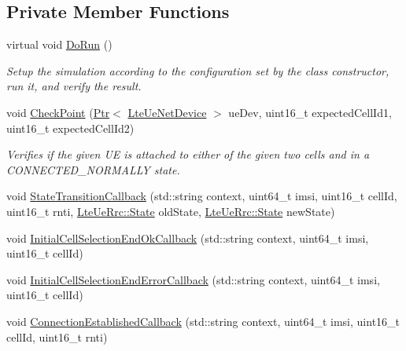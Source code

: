 \subsection*{Private Member Functions}
\begin{DoxyCompactItemize}
\item 
virtual void \hyperlink{classLteCellSelectionTestCase_a2ad9dadf26f7beb5d3ed1c6dfbcef90a}{Do\+Run} ()
\begin{DoxyCompactList}\small\item\em Setup the simulation according to the configuration set by the class constructor, run it, and verify the result. \end{DoxyCompactList}\item 
void \hyperlink{classLteCellSelectionTestCase_a12372e70c3609e0c3606a67494bc819e}{Check\+Point} (\hyperlink{classns3_1_1Ptr}{Ptr}$<$ \hyperlink{classns3_1_1LteUeNetDevice}{Lte\+Ue\+Net\+Device} $>$ ue\+Dev, uint16\+\_\+t expected\+Cell\+Id1, uint16\+\_\+t expected\+Cell\+Id2)
\begin{DoxyCompactList}\small\item\em Verifies if the given UE is attached to either of the given two cells and in a C\+O\+N\+N\+E\+C\+T\+E\+D\+\_\+\+N\+O\+R\+M\+A\+L\+LY state. \end{DoxyCompactList}\item 
void \hyperlink{classLteCellSelectionTestCase_af32c056747497954d3757c33ee9ecf0a}{State\+Transition\+Callback} (std\+::string context, uint64\+\_\+t imsi, uint16\+\_\+t cell\+Id, uint16\+\_\+t rnti, \hyperlink{classns3_1_1LteUeRrc_a241012c291e75681150c9214e11f6145}{Lte\+Ue\+Rrc\+::\+State} old\+State, \hyperlink{classns3_1_1LteUeRrc_a241012c291e75681150c9214e11f6145}{Lte\+Ue\+Rrc\+::\+State} new\+State)
\item 
void \hyperlink{classLteCellSelectionTestCase_a1356f0354e8a62c7078a325bc71c9f32}{Initial\+Cell\+Selection\+End\+Ok\+Callback} (std\+::string context, uint64\+\_\+t imsi, uint16\+\_\+t cell\+Id)
\item 
void \hyperlink{classLteCellSelectionTestCase_adb7a5645850282a9a8782206c28f1799}{Initial\+Cell\+Selection\+End\+Error\+Callback} (std\+::string context, uint64\+\_\+t imsi, uint16\+\_\+t cell\+Id)
\item 
void \hyperlink{classLteCellSelectionTestCase_a79d10a85379d39ecc6acef811de6c547}{Connection\+Established\+Callback} (std\+::string context, uint64\+\_\+t imsi, uint16\+\_\+t cell\+Id, uint16\+\_\+t rnti)
\end{DoxyCompactItemize}
